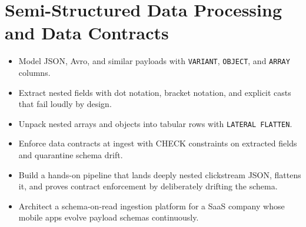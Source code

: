 \chapter{Semi-Structured Data Processing and Data Contracts}
%
\begin{objectives}
\begin{itemize}
    \item Model JSON, Avro, and similar payloads with \texttt{VARIANT}, \texttt{OBJECT}, and \texttt{ARRAY} columns.
    \item Extract nested fields with dot notation, bracket notation, and explicit casts that fail loudly by design.
    \item Unpack nested arrays and objects into tabular rows with \texttt{LATERAL FLATTEN}.
    \item Enforce data contracts at ingest with CHECK constraints on extracted fields and quarantine schema drift.
    \item Build a hands-on pipeline that lands deeply nested clickstream JSON, flattens it, and proves contract enforcement by deliberately drifting the schema.
    \item Architect a schema-on-read ingestion platform for a SaaS company whose mobile apps evolve payload schemas continuously.
\end{itemize}
\end{objectives}

